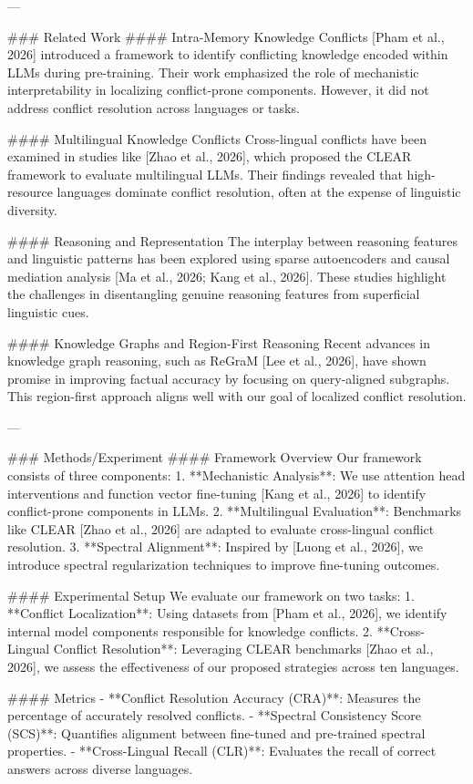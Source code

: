 ---

### Related Work
#### Intra-Memory Knowledge Conflicts
[Pham et al., 2026] introduced a framework to identify conflicting knowledge encoded within LLMs during pre-training. Their work emphasized the role of mechanistic interpretability in localizing conflict-prone components. However, it did not address conflict resolution across languages or tasks.

#### Multilingual Knowledge Conflicts
Cross-lingual conflicts have been examined in studies like [Zhao et al., 2026], which proposed the CLEAR framework to evaluate multilingual LLMs. Their findings revealed that high-resource languages dominate conflict resolution, often at the expense of linguistic diversity.

#### Reasoning and Representation
The interplay between reasoning features and linguistic patterns has been explored using sparse autoencoders and causal mediation analysis [Ma et al., 2026; Kang et al., 2026]. These studies highlight the challenges in disentangling genuine reasoning features from superficial linguistic cues.

#### Knowledge Graphs and Region-First Reasoning
Recent advances in knowledge graph reasoning, such as ReGraM [Lee et al., 2026], have shown promise in improving factual accuracy by focusing on query-aligned subgraphs. This region-first approach aligns well with our goal of localized conflict resolution.

---

### Methods/Experiment
#### Framework Overview
Our framework consists of three components: 
1. **Mechanistic Analysis**: We use attention head interventions and function vector fine-tuning [Kang et al., 2026] to identify conflict-prone components in LLMs.
2. **Multilingual Evaluation**: Benchmarks like CLEAR [Zhao et al., 2026] are adapted to evaluate cross-lingual conflict resolution.
3. **Spectral Alignment**: Inspired by [Luong et al., 2026], we introduce spectral regularization techniques to improve fine-tuning outcomes.

#### Experimental Setup
We evaluate our framework on two tasks:
1. **Conflict Localization**: Using datasets from [Pham et al., 2026], we identify internal model components responsible for knowledge conflicts.
2. **Cross-Lingual Conflict Resolution**: Leveraging CLEAR benchmarks [Zhao et al., 2026], we assess the effectiveness of our proposed strategies across ten languages.

#### Metrics
- **Conflict Resolution Accuracy (CRA)**: Measures the percentage of accurately resolved conflicts.
- **Spectral Consistency Score (SCS)**: Quantifies alignment between fine-tuned and pre-trained spectral properties.
- **Cross-Lingual Recall (CLR)**: Evaluates the recall of correct answers across diverse languages.


